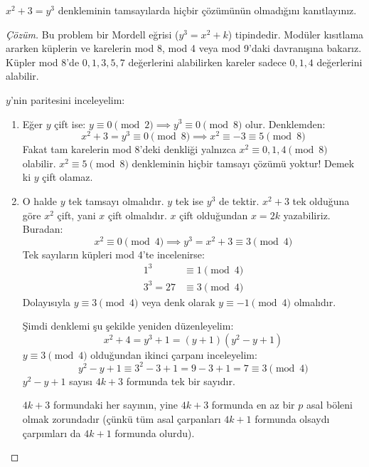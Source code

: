 \begin{example}
$x^2 + 3 = y^3$ denkleminin tamsayılarda hiçbir çözümünün olmadığını kanıtlayınız.
\end{example}

\begin{proof}[Çözüm]
Bu problem bir Mordell eğrisi ($y^3 = x^2 + k$) tipindedir. Modüler kısıtlama ararken küplerin ve karelerin mod 8, mod 4 veya mod 9'daki davranışına bakarız. Küpler mod 8'de $0, 1, 3, 5, 7$ değerlerini alabilirken kareler sadece $0, 1, 4$ değerlerini alabilir.

$y$'nin paritesini inceleyelim:
\begin{enumerate}
    \item Eğer $y$ çift ise:
    $y \equiv 0 \pmod 2 \implies y^3 \equiv 0 \pmod 8$ olur.
    Denklemden:
    \[
    x^2 + 3 = y^3 \equiv 0 \pmod 8 \implies x^2 \equiv -3 \equiv 5 \pmod 8
    \]
    Fakat tam karelerin mod 8'deki denkliği yalnızca $x^2 \equiv 0, 1, 4 \pmod 8$ olabilir. $x^2 \equiv 5 \pmod 8$ denkleminin hiçbir tamsayı çözümü yoktur! Demek ki $y$ çift olamaz.
    
    \item O halde $y$ tek tamsayı olmalıdır.
    $y$ tek ise $y^3$ de tektir. $x^2 + 3$ tek olduğuna göre $x^2$ çift, yani $x$ çift olmalıdır.
    $x$ çift olduğundan $x = 2k$ yazabiliriz.
    Buradan:
    \[
    x^2 \equiv 0 \pmod 4 \implies y^3 = x^2 + 3 \equiv 3 \pmod 4
    \]
    Tek sayıların küpleri mod 4'te incelenirse:
    \begin{align*}
    1^3 &\equiv 1 \pmod 4 \\
    3^3 = 27 &\equiv 3 \pmod 4
    \end{align*}
    Dolayısıyla $y \equiv 3 \pmod 4$ veya denk olarak $y \equiv -1 \pmod 4$ olmalıdır.
    
    Şimdi denklemi şu şekilde yeniden düzenleyelim:
    \[
    x^2 + 4 = y^3 + 1 = (y + 1)(y^2 - y + 1)
    \]
    $y \equiv 3 \pmod 4$ olduğundan ikinci çarpanı inceleyelim:
    \[
    y^2 - y + 1 \equiv 3^2 - 3 + 1 = 9 - 3 + 1 = 7 \equiv 3 \pmod 4
    \]
    $y^2 - y + 1$ sayısı $4k + 3$ formunda tek bir sayıdır.
    
    $4k + 3$ formundaki her sayının, yine $4k + 3$ formunda en az bir $p$ asal böleni olmak zorundadır (çünkü tüm asal çarpanları $4k + 1$ formunda olsaydı çarpımları da $4k + 1$ formunda olurdu).
    

\end{enumerate}
\end{proof}
